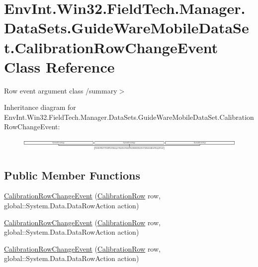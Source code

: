 \hypertarget{class_env_int_1_1_win32_1_1_field_tech_1_1_manager_1_1_data_sets_1_1_guide_ware_mobile_data_set_84870cfb39b084eaa7965416caa9d277}{}\section{Env\+Int.\+Win32.\+Field\+Tech.\+Manager.\+Data\+Sets.\+Guide\+Ware\+Mobile\+Data\+Set.\+Calibration\+Row\+Change\+Event Class Reference}
\label{class_env_int_1_1_win32_1_1_field_tech_1_1_manager_1_1_data_sets_1_1_guide_ware_mobile_data_set_84870cfb39b084eaa7965416caa9d277}


Row event argument class /summary$>$  


Inheritance diagram for Env\+Int.\+Win32.\+Field\+Tech.\+Manager.\+Data\+Sets.\+Guide\+Ware\+Mobile\+Data\+Set.\+Calibration\+Row\+Change\+Event\+:\begin{figure}[H]
\begin{center}
\leavevmode
\includegraphics[height=0.647025cm]{class_env_int_1_1_win32_1_1_field_tech_1_1_manager_1_1_data_sets_1_1_guide_ware_mobile_data_set_84870cfb39b084eaa7965416caa9d277}
\end{center}
\end{figure}
\subsection*{Public Member Functions}
\begin{DoxyCompactItemize}
\item 
\hyperlink{class_env_int_1_1_win32_1_1_field_tech_1_1_manager_1_1_data_sets_1_1_guide_ware_mobile_data_set_84870cfb39b084eaa7965416caa9d277_a5d466154e6509b066f61fa1f112ae001}{Calibration\+Row\+Change\+Event} (\hyperlink{class_env_int_1_1_win32_1_1_field_tech_1_1_manager_1_1_data_sets_1_1_guide_ware_mobile_data_set_1_1_calibration_row}{Calibration\+Row} row, global\+::\+System.\+Data.\+Data\+Row\+Action action)
\item 
\hyperlink{class_env_int_1_1_win32_1_1_field_tech_1_1_manager_1_1_data_sets_1_1_guide_ware_mobile_data_set_84870cfb39b084eaa7965416caa9d277_a5d466154e6509b066f61fa1f112ae001}{Calibration\+Row\+Change\+Event} (\hyperlink{class_env_int_1_1_win32_1_1_field_tech_1_1_manager_1_1_data_sets_1_1_guide_ware_mobile_data_set_1_1_calibration_row}{Calibration\+Row} row, global\+::\+System.\+Data.\+Data\+Row\+Action action)
\item 
\hyperlink{class_env_int_1_1_win32_1_1_field_tech_1_1_manager_1_1_data_sets_1_1_guide_ware_mobile_data_set_84870cfb39b084eaa7965416caa9d277_a5d466154e6509b066f61fa1f112ae001}{Calibration\+Row\+Change\+Event} (\hyperlink{class_env_int_1_1_win32_1_1_field_tech_1_1_manager_1_1_data_sets_1_1_guide_ware_mobile_data_set_1_1_calibration_row}{Calibration\+Row} row, global\+::\+System.\+Data.\+Data\+Row\+Action action)
\end{DoxyCompactItemize}
